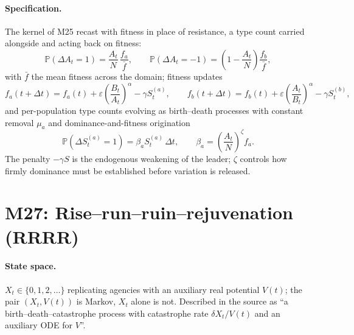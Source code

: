 \documentclass[11pt,a4paper]{report}
\newcommand{\pr}[1]{\mathbb{P}\!\left(#1\right)}
\newcommand{\lrb}[1]{\left(#1\right)}
\newcommand{\Xt}{X_t}
\newcommand{\source}[1]{\par\noindent{\small\textit{Specified in #1.}}\par\medskip}
\begin{document}
\paragraph{Specification.} The kernel of M25 recast with fitness in place
of resistance, a type count carried alongside and acting back on fitness:
\begin{equation}
\pr{\Delta A_t=1}=\frac{A_t}{N}\,\frac{f_a}{\bar f},
\qquad
\pr{\Delta A_t=-1}=\lrb{1-\frac{A_t}{N}}\frac{f_b}{\bar f},
\end{equation}
with $\bar f$ the mean fitness across the domain; fitness updates
\begin{equation}
f_a(t+\Delta t)=f_a(t)+\varepsilon\lrb{\frac{B_t}{A_t}}^{\!\alpha}
-\gamma S^{(a)}_t,
\qquad
f_b(t+\Delta t)=f_b(t)+\varepsilon\lrb{\frac{A_t}{B_t}}^{\!\alpha}
-\gamma S^{(b)}_t,
\end{equation}
and per-population type counts evolving as birth--death processes with
constant removal $\mu_a$ and dominance-and-fitness origination
\begin{equation}
\pr{\Delta S^{(a)}_t=1}=\beta_a S^{(a)}_t\,\Delta t,
\qquad
\beta_a=\lrb{\frac{A_t}{N}}^{\!\zeta}f_a .
\end{equation}
The penalty $-\gamma S$ is the endogenous weakening of the leader;
$\zeta$ controls how firmly dominance must be established before variation
is released.

\section{M27: Rise--run--ruin--rejuvenation (RRRR)}
\source{\S9.4.2}

\paragraph{State space.} $\Xt\in\{0,1,2,\ldots\}$ replicating agencies
with an auxiliary real potential $V(t)$; the pair $(\Xt,V(t))$ is Markov,
$\Xt$ alone is not. Described in the source as ``a
birth--death--catastrophe process with catastrophe rate
$\delta X_t/V(t)$ and an auxiliary ODE for $V$''.
\end{document}
